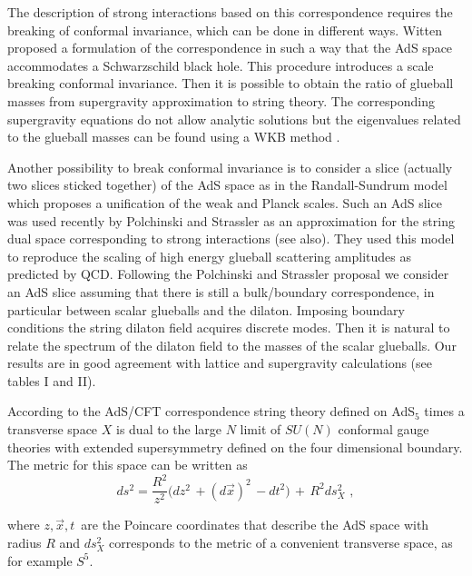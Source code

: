 \documentclass[a4paper,twocolumn,prl,groupedaddress,nofootinbib,showpacs]{revtex4}
\begin{document}
The description of strong interactions based on this correspondence  
requires the breaking of conformal invariance, which can be done 
in different ways.  
Witten \cite{Wi2} proposed a formulation of the correspondence in such 
a way that the AdS space accommodates a  Schwarzschild black hole.
This procedure introduces a scale breaking conformal invariance. 
Then it is possible to obtain the ratio of glueball masses from 
supergravity approximation to string theory.
The corresponding supergravity equations do not allow analytic 
solutions but the eigenvalues related to the glueball masses 
can be found using a WKB method \cite{MASSG}. 


Another possibility to break conformal invariance is to consider 
a slice (actually two slices sticked together) of the AdS space 
as in the Randall-Sundrum model\cite{RS1,RS2} which proposes a 
unification of the weak and Planck scales.
Such an AdS slice was used recently by Polchinski and Strassler
\cite{PS} as an approximation for the string dual space corresponding to 
strong interactions (see also\cite{GI,BB3,BT,AN}).
They used this model to reproduce the scaling  of high energy glueball 
scattering amplitudes as predicted by QCD\cite{QCD1,BRO}. 
Following the Polchinski and Strassler proposal we consider an AdS slice 
assuming that there is still a bulk/boundary correspondence, 
in particular between scalar glueballs and the dilaton.
Imposing boundary conditions the string dilaton field acquires 
discrete modes. 
Then it is natural to relate the spectrum of the dilaton field to the 
masses  of the scalar glueballs. Our results are in good agreement with
lattice and supergravity calculations (see tables I and II).

  
According to the AdS/CFT correspondence string theory defined on 
AdS$_5 $  times a transverse space $X$ is dual to the large $N$ limit 
of  $SU(N)$ conformal gauge theories with extended supersymmetry defined on 
the four dimensional boundary. The metric for this space can be written as
\begin{equation}
\label{metric}
ds^2=\frac {R^2 }{ z^2}\Big( dz^2 \,+(d\vec x)^2\,
- dt^2 \Big) \,+ \,R^2 ds^2_X \,\,,
 \end{equation}
 
\noindent where $z, \vec x , t\,$ are the Poincare coordinates that 
describe the AdS space with radius $R$ and $ds^2_X$ corresponds to 
the metric of a convenient transverse space, as for example $S^5$.  
\end{document}
